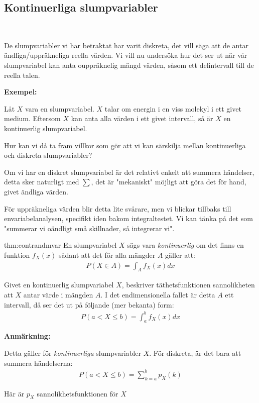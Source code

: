 \newpage
\subsection{Kontinuerliga slumpvariabler}\hfill\\\par
\noindent De slumpvariabler vi har betraktat har varit diskreta, det vill säga att de antar ändliga/uppräkneliga reella värden. Vi vill nu undersöka hur det ser ut när vår slumpvariabel kan anta ouppräknelig mängd värden, såsom ett delintervall till de reella talen.
\par\bigskip
\noindent\textbf{Exempel:}\par
\noindent Låt $X$ vara en slumpvariabel. $X$ talar om energin i en viss molekyl i ett givet medium. Eftersom $X$ kan anta alla värden i ett givet intervall, så är $X$ en kontinuerlig slumpvariabel.
\par\bigskip
\noindent Hur kan vi då ta fram villkor som gör att vi kan särskilja mellan kontinuerliga och diskreta slumpvariabler?\par
\noindent Om vi har en diskret slumpvariabel är det relativt enkelt att summera händelser, detta sker naturligt med $\sum$, det är "mekaniskt" möjligt att göra det för hand, givet ändliga värden.
\par\bigskip
\noindent För uppräkneliga värden blir detta lite svårare, men vi blickar tillbaks till envariabelanalysen, specifikt iden bakom integraltestet. Vi kan tänka på det som "summerar vi oändligt små skillnader, så integrerar vi".
\par\bigskip
\begin{theo}{thm:contrandmvar}
  En slumpvariabel $X$ sägs vara \textit{kontinuerlig} om det finns en funktion $f_X(x)$ sådant att det för alla mängder $A$ gäller att:
  \begin{equation*}
    \begin{gathered}
      P(X\in A) = \int_{A}f_X(x)dx
    \end{gathered}
  \end{equation*}
\end{theo}
\par\bigskip
\noindent Givet en kontinuerlig slumpvariabel $X$, beskriver täthetsfunktionen sannolikheten att $X$ antar värde i mängden $A$. I det endimensionella fallet är detta $A$ ett intervall, då ser det ut på följande (mer bekanta) form:
\begin{equation*}
  \begin{gathered}
    P(a< X\leq b) = \int_{a}^{b}f_X(x)dx
  \end{gathered}
\end{equation*}
\par\bigskip
\noindent\textbf{Anmärkning:}\par
\noindent Detta gäller för \textit{kontinuerliga} slumpvariabler $X$. För diskreta, är det bara att summera händelserna:
\begin{equation*}
  \begin{gathered}
    P(a< X\leq b) = \sum_{k=a}^{b}p_X(k)
  \end{gathered}
\end{equation*}\par
\noindent Här är $p_X$ sannolikhetsfunktionen för $X$
